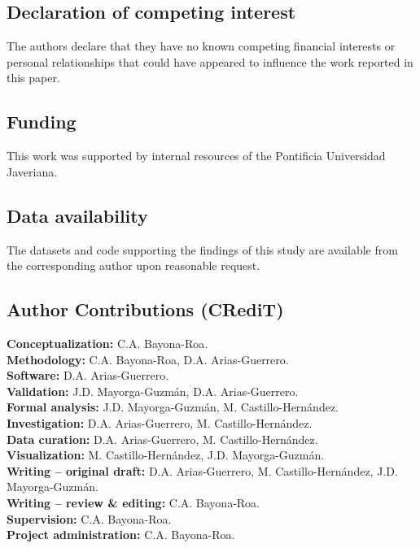 \documentclass[preprint,12pt]{elsarticle}
\begin{document}
\subsection{Declaration of competing interest}
The authors declare that they have no known competing financial interests or personal relationships that could have appeared to influence the work reported in this paper.

\subsection{Funding}
This work was supported by internal resources of the Pontificia Universidad Javeriana. %

\subsection{Data availability}
The datasets and code supporting the findings of this study are available from the corresponding author upon reasonable request.

\subsection{Author Contributions (CRediT)}
\textbf{Conceptualization:} C.A. Bayona-Roa. \\
\textbf{Methodology:} C.A. Bayona-Roa, D.A. Arias-Guerrero. \\
\textbf{Software:} D.A. Arias-Guerrero. \\
\textbf{Validation:} J.D. Mayorga-Guzmán, D.A. Arias-Guerrero. \\
\textbf{Formal analysis:} J.D. Mayorga-Guzmán, M. Castillo-Hernández. \\
\textbf{Investigation:} D.A. Arias-Guerrero, M. Castillo-Hernández. \\
\textbf{Data curation:} D.A. Arias-Guerrero, M. Castillo-Hernández. \\
\textbf{Visualization:} M. Castillo-Hernández, J.D. Mayorga-Guzmán. \\
\textbf{Writing – original draft:} D.A. Arias-Guerrero, M. Castillo-Hernández, J.D. Mayorga-Guzmán. \\
\textbf{Writing – review \& editing:} C.A. Bayona-Roa. \\
\textbf{Supervision:} C.A. Bayona-Roa. \\
\textbf{Project administration:} C.A. Bayona-Roa.
\end{document}
